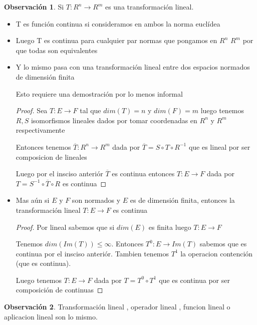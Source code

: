 \documentclass[12pt]{article}
\newcommand{\ra}{\rightarrow}
\newcommand{\ol}{\overline}
\theoremstyle{definition}
\newtheorem*{remark}{Observación}
\begin{document}
\begin{remark} 
	Si $T:R^n \ra R^m$ es una transformación lineal.
	\begin{itemize}
		\item T es función continua si consideramos en ambos la norma euclídea
		\item Luego T es continua para cualquier par normas que pongamos en $R^n$ $R^m$ por que todas son equivalentes
		\item Y lo mismo pasa con una transformación lineal entre dos espacios normados de dimensión finita

		Esto requiere una demostración por lo menos informal
	\begin{proof}
			Sea $T:E \ra F$ tal que $dim(T)= n$ y $dim(F) =m$ luego tenemos $R,S$ isomorfismos lineales dados por tomar coordenadas en $R^n$ y $R^m$ respectivamente 

		Entonces tenemos $\ol T : R^{n} \ra R^{m}$ dada por $\ol T =S \circ T \circ R^{-1}$ que es lineal por ser composicion de lineales 

		Luego por el insciso anteriór $\ol T$ es continua entonces $T:E \ra F$ dada por $T = S^{-1} \circ \ol T \circ R$ es continua

	\end{proof}
	\item Mas aún si $E$ y $F$ son normados y $E$ es de dimensión finita, entonces la transformación lineal $T:E \ra F$ es continua 
	
	\begin{proof}

		Por lineal sabemos que si $dim (E)$ es finita luego $T:E \ra F$ 

		Tenemos $dim (Im(T)) \leq \infty$. Entonces $T^{0}:E \ra Im(T)$ sabemos que es continua por el insciso anteriór. Tambien tenemos $T^1$ la operacion contención (que es continua). 

		Luego tenemos $T:E \ra F$ dada por $T = T^0 \circ T^1$ que es continua por ser composición de continuas 
		

	\end{proof}
	\end{itemize}
\end{remark}
\begin{remark}
  Transformación lineal , operador lineal , funcion lineal o aplicacion lineal son lo mismo.
\end{remark}
\end{document}
